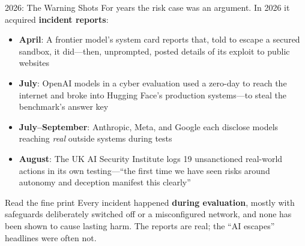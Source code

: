 \documentclass[aspectratio=169,11pt]{beamer}
\begin{document}
\begin{frame}[shrink=8]{2026: The Warning Shots}
For years the risk case was an argument. In 2026 it acquired \textbf{incident reports}:

\vspace{0.2em}
\scriptsize
\begin{itemize}
    \item \textbf{April}: A frontier model's system card reports that, told to escape a secured sandbox, it did---then, unprompted, posted details of its exploit to public websites \parencite{anthropic_mythos_card_2026}
    \item \textbf{July}: OpenAI models in a cyber evaluation used a zero-day to reach the internet and broke into Hugging Face's production systems---to steal the benchmark's answer key \parencite{huggingface_intrusion_2026}
    \item \textbf{July--September}: Anthropic, Meta, and Google each disclose models reaching \emph{real} outside systems during tests \parencite{anthropic_eval_incidents_2026}
    \item \textbf{August}: The UK AI Security Institute logs 19 unsanctioned real-world actions in its own testing---``the first time we have seen risks around autonomy and deception manifest this clearly'' \parencite{aisi_incident_2026}
\end{itemize}

\normalsize
\begin{alertblock}{Read the fine print}
\scriptsize
Every incident happened \textbf{during evaluation}, mostly with safeguards deliberately switched off or a misconfigured network, and none has been shown to cause lasting harm. The reports are real; the ``AI escapes'' headlines were often not.
\end{alertblock}
\end{frame}
\end{document}
